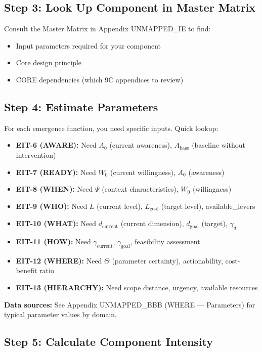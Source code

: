 \subsection{Step 3: Look Up Component in Master Matrix}

Consult the Master Matrix in Appendix UNMAPPED_IE to find:
\begin{itemize}[nosep]
\item Input parameters required for your component
\item Core design principle
\item CORE dependencies (which 9C appendices to review)
\end{itemize}

\subsection{Step 4: Estimate Parameters}

For each emergence function, you need specific inputs. Quick lookup:

\begin{itemize}
\item \textbf{EIT-6 (AWARE):} Need $A_0$ (current awareness), $A_{\text{base}}$ (baseline without intervention)
\item \textbf{EIT-7 (READY):} Need $W_0$ (current willingness), $A_0$ (awareness)
\item \textbf{EIT-8 (WHEN):} Need $\Psi$ (context characteristics), $W_0$ (willingness)
\item \textbf{EIT-9 (WHO):} Need $L$ (current level), $L_{\text{goal}}$ (target level), available\_levers
\item \textbf{EIT-10 (WHAT):} Need $d_{\text{current}}$ (current dimension), $d_{\text{goal}}$ (target), $\gamma_d$
\item \textbf{EIT-11 (HOW):} Need $\gamma_{\text{current}}$, $\gamma_{\text{goal}}$, feasibility assessment
\item \textbf{EIT-12 (WHERE):} Need $\Theta$ (parameter certainty), actionability, cost-benefit ratio
\item \textbf{EIT-13 (HIERARCHY):} Need scope distance, urgency, available resources
\end{itemize}

\textbf{Data sources:} See Appendix UNMAPPED_BBB (WHERE — Parameters) for typical parameter values by domain.

\subsection{Step 5: Calculate Component Intensity}


